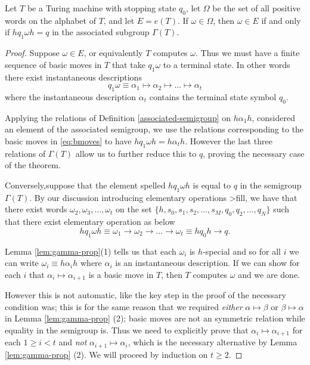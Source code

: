 \begin{lemma}
  \label{lem:semi-turing}
  Let $T$ be a Turing machine with stopping state $q_0$, let $\Omega$ be the set of all positive words on the alphabet of $T$, and let $E = e(T)$. If $\omega \in \Omega$, then $\omega \in E$ if and only if $hq_1\omega h = q$ in the associated subgroup $\Gamma(T)$.
\end{lemma}

\begin{proof}
  Suppose $\omega \in E$, or equivalently $T$ computes $\omega$. Thus we must have a finite sequence of basic moves in $T$ that take $q_1\omega$ to a terminal state. In other words there exist instantaneous descriptions
  \begin{equation}
    \label{eq:bmoves}
    q_1\omega \equiv \alpha_1 \mapsto \alpha_2 \mapsto \dots \mapsto \alpha_t
  \end{equation}
  where the instantaneous description $\alpha_t$ contains the terminal state symbol $q_0$.

  Applying the relations of Definition \ref{associated-semigroup} on $h\alpha_1 h$, considered an element of the associated semigroup, we use the relations corresponding to the basic moves in \ref{eq:bmoves} to have $hq_1\omega h = h \alpha_t h$. However the last three relations of $\Gamma(T)$ allow us to further reduce this to $q$, proving the necessary case of the theorem.

  Conversely,suppose that the element spelled $hq_1\omega h$ is equal to $q$ in the semigroup $\Gamma(T)$. By our discussion introducing elementary operations >fill, we have that there exist words $\omega_2, \omega_3,\dots, \omega_t$ on the set $\{ h,s_0,s_1,s_2, \dots, s_M, q_0,q_2, \dots, q_N \}$ such that there exist elementary operation as below
  \begin{equation*}
    hq_1 \omega h \equiv \omega_1 \rightarrow \omega_2 \rightarrow \dots \rightarrow \omega_t \equiv h q_0 h \rightarrow q.
  \end{equation*}

  Lemma \ref{lem:gamma-prop}(1) tells us that each $\omega_i$ is $h$-special and so for all $i$ we can write $\omega_i \equiv h \alpha_i h$ where $\alpha_i$ is an instantaneous description. If we can show for each $i$ that $\alpha_i \mapsto \alpha_{i+1}$ is a basic move in $T$, then $T$ computes $\omega$ and we are done.

  However this is not automatic, like the key step in the proof of the necessary condition was; this is for the same reason that we required \emph{either} $\alpha \mapsto \beta$ or $\beta \mapsto \alpha$ in Lemma \ref{lem:gamma-prop} (2); basic moves are not an symmetric relation while equality in the semigroup is. Thus we need to explicitly prove that $\alpha_i \mapsto \alpha_{i+1}$ for each $1 \geq i <t$ and \emph{not} $\alpha_{i+1} \mapsto \alpha_i$, which is the necessary alternative by Lemma \ref{lem:gamma-prop} (2). We will proceed by induction on $t \geq 2$.


\end{proof}
